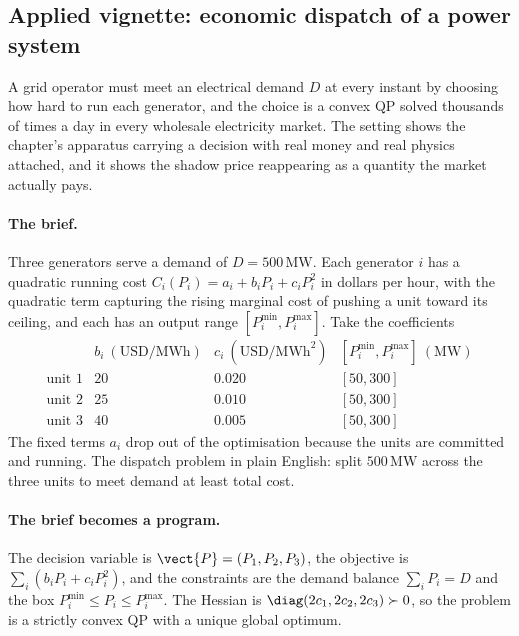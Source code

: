 

\subsection{Applied vignette: economic dispatch of a power system}

A grid operator must meet an electrical demand $D$ at every instant by
choosing how hard to run each generator, and the choice is a convex QP
solved thousands of times a day in every wholesale electricity market.
The setting shows the chapter's apparatus carrying a decision with real
money and real physics attached, and it shows the shadow price
reappearing as a quantity the market actually pays.

\paragraph{The brief.}
Three generators serve a demand of $D = 500\,\si{\mega\watt}$. Each
generator $i$ has a quadratic running cost $C_{i}(P_{i}) = a_{i} +
b_{i} P_{i} + c_{i} P_{i}^{2}$ in dollars per hour, with the quadratic
term capturing the rising marginal cost of pushing a unit toward its
ceiling, and each has an output range $[P_{i}^{\min}, P_{i}^{\max}]$.
Take the coefficients
\[
\begin{array}{c|ccc}
 & b_{i}\ (\text{USD/MWh}) & c_{i}\ (\text{USD/MWh}^{2})
 & [P_{i}^{\min}, P_{i}^{\max}]\ (\si{\mega\watt}) \\ \hline
\text{unit 1} & 20 & 0.020 & [50, 300] \\
\text{unit 2} & 25 & 0.010 & [50, 300] \\
\text{unit 3} & 40 & 0.005 & [50, 300]
\end{array}
\]
The fixed terms $a_{i}$ drop out of the optimisation because the units
are committed and running. The dispatch problem in plain English:
split $500\,\si{\mega\watt}$ across the three units to meet demand at
least total cost.

\paragraph{The brief becomes a program.}
The decision variable is $\vect{P} = (P_{1}, P_{2}, P_{3})$, the
objective is $\sum_{i}(b_{i} P_{i} + c_{i} P_{i}^{2})$, and the
constraints are the demand balance $\sum_{i} P_{i} = D$ and the box
$P_{i}^{\min} \leq P_{i} \leq P_{i}^{\max}$. The Hessian is
$\diag(2c_{1}, 2c_{2}, 2c_{3}) \succ 0$, so the problem is a strictly
convex QP with a unique global optimum.

